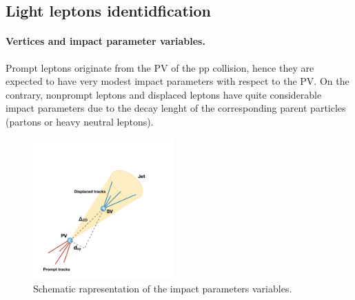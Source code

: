 \subsection*{Light leptons
  identidfication} \label{sec:c2leptonvariables}

\paragraph{Vertices and impact parameter variables.} \label{sec:c2IP}
Prompt leptons originate from the PV of the pp collision, hence they
are expected to have very modest impact parameters with respect to the
PV. On the contrary, nonprompt leptons and displaced leptons have
quite considerable impact parameters due to the decay lenght of the
corresponding parent particles (partons or heavy neutral leptons).

\begin{figure}[h]
\centering
  \includegraphics[clip,trim=1cm 0cm 3cm 4cm, width=0.48\textwidth]{Figures/c2/grafico.pdf}
  \caption{Schematic rapresentation of the impact parameters variables.}
  \label{fig:impact}
\end{figure}

